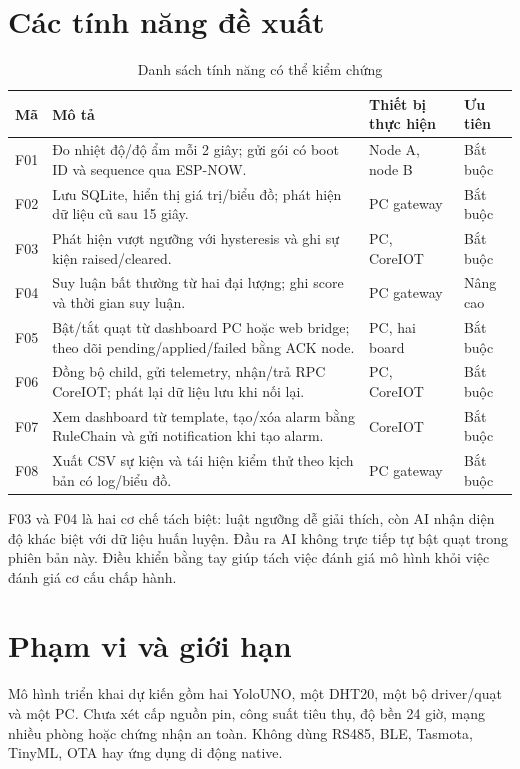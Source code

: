 \section{Các tính năng đề xuất}
\begin{longtable}{P{1cm}P{8.2cm}P{3.1cm}P{2cm}}
\caption{Danh sách tính năng có thể kiểm chứng}\label{tab:features}\\
\toprule Mã & Mô tả & Thiết bị thực hiện & Ưu tiên \\ \midrule
F01 & Đo nhiệt độ/độ ẩm mỗi 2 giây; gửi gói có boot ID và sequence qua ESP-NOW. & Node A, node B & Bắt buộc \\
F02 & Lưu SQLite, hiển thị giá trị/biểu đồ; phát hiện dữ liệu cũ sau 15 giây. & PC gateway & Bắt buộc \\
F03 & Phát hiện vượt ngưỡng với hysteresis và ghi sự kiện raised/cleared. & PC, CoreIOT & Bắt buộc \\
F04 & Suy luận bất thường từ hai đại lượng; ghi score và thời gian suy luận. & PC gateway & Nâng cao \\
F05 & Bật/tắt quạt từ dashboard PC hoặc web bridge; theo dõi pending/applied/failed bằng ACK node. & PC, hai board & Bắt buộc \\
F06 & Đồng bộ child, gửi telemetry, nhận/trả RPC CoreIOT; phát lại dữ liệu lưu khi nối lại. & PC, CoreIOT & Bắt buộc \\
F07 & Xem dashboard từ template, tạo/xóa alarm bằng RuleChain và gửi notification khi tạo alarm. & CoreIOT & Bắt buộc \\
F08 & Xuất CSV sự kiện và tái hiện kiểm thử theo kịch bản có log/biểu đồ. & PC gateway & Bắt buộc \\
\bottomrule
\end{longtable}

F03 và F04 là hai cơ chế tách biệt: luật ngưỡng dễ giải thích, còn AI nhận diện độ khác biệt với dữ liệu huấn luyện. Đầu ra AI không trực tiếp tự bật quạt trong phiên bản này. Điều khiển bằng tay giúp tách việc đánh giá mô hình khỏi việc đánh giá cơ cấu chấp hành.

\section{Phạm vi và giới hạn}
Mô hình triển khai dự kiến gồm hai YoloUNO, một DHT20, một bộ driver/quạt và một PC. Chưa xét cấp nguồn pin, công suất tiêu thụ, độ bền 24 giờ, mạng nhiều phòng hoặc chứng nhận an toàn. Không dùng RS485, BLE, Tasmota, TinyML, OTA hay ứng dụng di động native.


